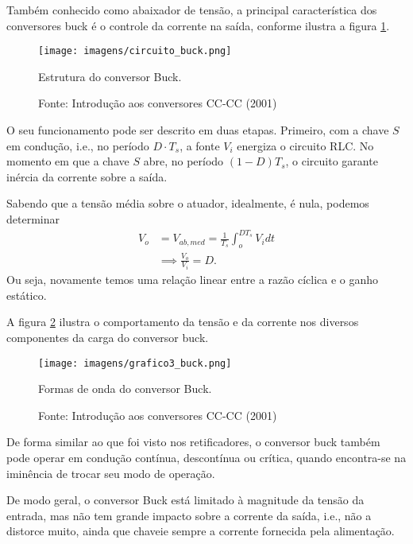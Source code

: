 
Também conhecido como abaixador de tensão, a principal característica dos conversores buck é o controle da corrente na saída, conforme ilustra a figura \ref{cb}.

\begin{figure}[h]
\center
\texttt{[image: imagens/circuito\_buck.png]}
\caption{Estrutura do conversor Buck.}\label{cb} 
\caption*{Fonte: Introdução aos conversores CC-CC (2001)}
\end{figure}
 
O seu funcionamento pode ser  descrito em duas etapas. Primeiro, com a chave $S$ em condução, i.e., no período $D \cdot T_s$, a fonte $V_i$ energiza o circuito RLC. No momento em que a chave $S$ abre, no período $\left( 1-D \right) T_s$, o circuito garante inércia da corrente sobre a saída.

Sabendo que a tensão média sobre o atuador, idealmente, é nula, podemos determinar 
\begin{align*}
    V_{o} &= V_{ab,med} =  \frac{1}{T_{s}}\int_{o}^{DT_{s}}V_{i}dt\\
	  &\implies \frac{V_{o}}{V_{i}} = D
.\end{align*} Ou seja, novamente temos uma relação linear entre a razão cíclica e o ganho estático.

A figura \ref{g3b} ilustra o comportamento da tensão e da corrente nos diversos componentes da carga do conversor buck.

\begin{figure}[h]
\center
\texttt{[image: imagens/grafico3\_buck.png]}
\caption{Formas de onda do conversor Buck.}\label{g3b} 
\caption*{Fonte: Introdução aos conversores CC-CC (2001)}
\end{figure}

De forma similar ao que foi visto nos retificadores, o conversor buck também pode operar em condução contínua, descontínua ou crítica, quando encontra-se na iminência de trocar seu modo de operação.

De modo geral, o conversor Buck está limitado à magnitude da tensão da entrada, mas não tem grande impacto sobre a corrente da saída, i.e., não a distorce muito, ainda que chaveie sempre a corrente fornecida pela alimentação.

